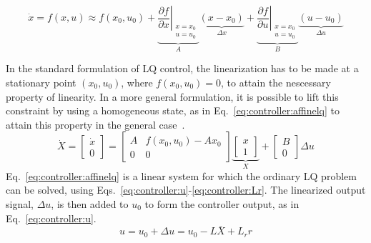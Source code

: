     \begin{equation}
        \label{eq:controller:gainscheduling:xdot}
        \dot{x} = f(x,u) \approx f(x_{0},u_{0})
            + \underbrace{\left. \frac{\partial f}{\partial x} \right|_{
                \begin{array}{l}
                    x=x_{0} \\
                    u=u_{0}
                \end{array}
            }}_{A}
                \underbrace{\left( x-x_{0} \right)}_{\Delta x}
            + \underbrace{\left. \frac{\partial f}{\partial u} \right|_{
                \begin{array}{l}
                    x=x_{0} \\
                    u=u_{0}
                \end{array}
            }}_{B}
                \underbrace{\left( u-u_{0} \right)}_{\Delta u}
    \end{equation}

    In the standard formulation of LQ control, the linearization has to be made
    at a stationary point $(x_{0},u_{0})$, where $f(x_{0},u_{0}) = 0$, to
    attain the nescessary property of linearity.
    In a more general formulation, it is possible to lift this constraint by
    using a homogeneous state, as in Eq.~\eqref{eq:controller:affinelq}
    to attain this property in the general case~\citep{Rantzer99piecewiselinear}.
    \begin{equation}
    \label{eq:controller:affinelq}
        \dot{X} = \left[
        \begin{array}{c}
            \dot{x} \\
            0
        \end{array}\right] =
        \left[
        \begin{array}{cc}
            A & f(x_{0},u_{0})-Ax_{0} \\
            0 & 0
        \end{array}\right]
        \underbrace{\left[
        \begin{array}{c}
            x \\
            1
        \end{array}\right]}_{X}
        +
        \left[
        \begin{array}{c}
            B \\
            0
        \end{array}\right]
        \Delta u
    \end{equation}
    Eq.~\eqref{eq:controller:affinelq} is a linear system for which
    the ordinary LQ problem can be solved, using Eqs.~\eqref{eq:controller:u}-\eqref{eq:controller:Lr}.
    The linearized output signal, $\Delta u$, is then added
    to $u_{0}$ to form the controller output, as in Eq.~\eqref{eq:controller:u}.
    \begin{equation}
    \label{eq:controller:u}
        u = u_{0} + \Delta u = u_{0} - L\bar{X} + L_{r}r
    \end{equation}

